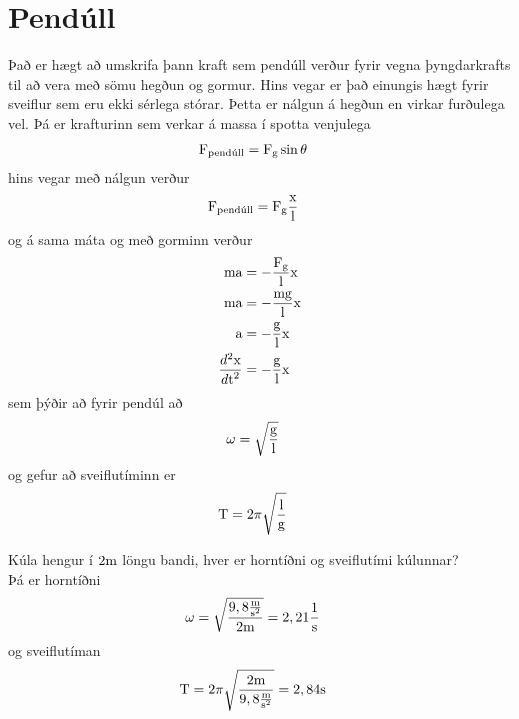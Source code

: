 \section{Pendúll}
Það er hægt að umskrifa þann kraft sem pendúll verður fyrir vegna þyngdarkrafts til að
vera með sömu hegðun og gormur. Hins vegar er það einungis hægt fyrir sveiflur sem eru
ekki sérlega stórar. %
%
Þetta er nálgun á hegðun en virkar furðulega vel. Þá er krafturinn 
sem verkar á massa í spotta venjulega
\begin{align*}
	\textrm{F}_\text{pendúll} &= \textrm{F}_{\textrm{g}} \sin{\theta}
\end{align*}
hins vegar með nálgun verður
\begin{align*}
	\textrm{F}_\text{pendúll} &= \textrm{F}_{\textrm{g}} \frac{\textrm{x}}{\textrm{l}}
\end{align*}
og á sama máta og með gorminn verður
\begin{align*}
	\textrm{m} \textrm{a} 
		&= -  \frac{\textrm{F}_{\textrm{g}}}{\textrm{l}} \textrm{x} \\
	\textrm{m} \textrm{a} 
		&= -  \frac{\textrm{m} \textrm{g}}{\textrm{l}} \textrm{x} \\
	\textrm{a} 
		&= - \frac{\textrm{g}}{\textrm{l}} \textrm{x} \\
	\frac{d^2 \textrm{x}}{d \textrm{t}^2}
		&= - \frac{\textrm{g}}{\textrm{l}} \textrm{x}
\end{align*}
sem þýðir að fyrir pendúl að
\begin{align}
	\omega &= \sqrt{ \frac{\textrm{g}}{\textrm{l}} }
\end{align}
og gefur að sveiflutíminn er
\begin{align}
	\text{T} &= 2 \pi \sqrt{ \frac{\textrm{l}}{\textrm{g}} }
\end{align}
\begin{formalexample}
Kúla hengur í $2 \textrm{m}$ löngu bandi, hver er horntíðni og sveiflutími
kúlunnar?
\\[4 ex]
Þá er horntíðni
\begin{align*}
	\omega &= \sqrt{ \frac{9,8 \frac{\textrm{m}}{\textrm{s}^2}}{2 \textrm{m}} }
		= 2,21 \frac{\textrm{1}}{\textrm{s}}
\end{align*}
og sveiflutíman
\begin{align*}
	\text{T} &= 2 \pi \sqrt{ \frac{2 \textrm{m}}{9,8 \frac{\textrm{m}}{\textrm{s}^2}} }
		= 2,84 \textrm{s}
\end{align*}
\end{formalexample}

